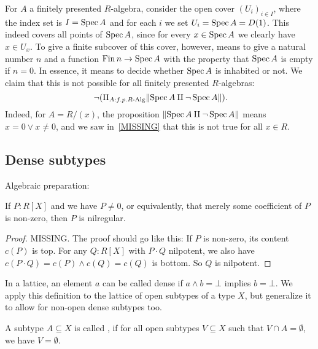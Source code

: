 \begin{example}
  For $A$ a finitely presented $R$-algebra,
  consider the open cover ${(U_i)}_{i \in I}$,
  where the index set is $I = \operatorname{Spec} A$
  and for each $i$ we set $U_i = \operatorname{Spec} A = D(1)$.
  This indeed covers all points of $\operatorname{Spec} A$,
  since for every $x \in \operatorname{Spec} A$ we clearly have $x \in U_x$.
  To give a finite subcover of this cover, however,
  means to give a natural number $n$ and a function $\operatorname{Fin} n \to \operatorname{Spec} A$
  with the property that $\operatorname{Spec} A$ is empty if $n = 0$.
  In essence, it means to decide whether $\operatorname{Spec} A$ is inhabited or not.
  We claim that this is not possible for all finitely presented $R$-algebras:
  \[ \lnot (\Pi_{A : f.p. R\text{-Alg}} \propTrunc{\Spec A \amalg \lnot \Spec A} )
     \rlap{.} \]
  Indeed, for $A = R/(x)$,
  the proposition $\lVert \operatorname{Spec} A \amalg \lnot \operatorname{Spec} A \rVert$
  means $x = 0 \lor x \neq 0$,
  and we saw in~\ref{MISSING} that this is not true for all $x \in R$.
\end{example}

\subsection{Dense subtypes}

Algebraic preparation:

\begin{lemma}%
  \label{nilregular-non-zero-polynomial}
  If $P:R[X]$ and we have $P\neq 0$, or equivalently,
  that merely some coefficient of $P$ is non-zero,
  then $P$ is nilregular.
\end{lemma}

\begin{proof}
  MISSING.
  The proof should go like this: If $P$ is non-zero, its content $c(P)$ is top.
  For any $Q:R[X]$ with $P\cdot Q$ nilpotent, we also have $c(P\cdot Q)=c(P)\wedge c(Q)=c(Q)$ is bottom.
  So $Q$ is nilpotent.
\end{proof}

In a lattice,
an element $a$ can be called dense
if $a \wedge b = \bot$ implies $b = \bot$.
We apply this definition to the lattice of open subtypes of a type $X$,
but generalize it to allow for non-open dense subtypes too.

\begin{definition}
  A subtype $A\subseteq X$ is called ,
  if for all open subtypes $V\subseteq X$ such that $V\cap A=\emptyset$, we have $V=\emptyset$.
\end{definition}


